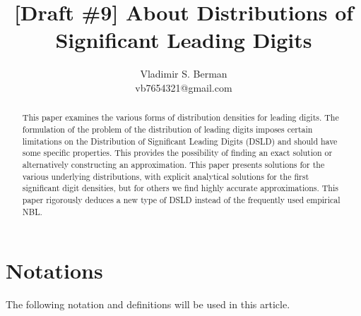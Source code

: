 \documentclass[titlepage,fleqn]{article}%
\begin{document}
\title{[Draft \#9] About Distributions of Significant Leading Digits}
\author{Vladimir S. Berman\\vb7654321@gmail.com}
\maketitle

\begin{abstract}
This paper examines the various forms of distribution densities for leading
digits. The formulation of the problem of the distribution of leading digits
imposes certain limitations on the Distribution of Significant Leading Digits
(DSLD) and should have some specific properties. This provides the possibility
of finding an exact solution or alternatively constructing an approximation.
This paper presents solutions for the various underlying distributions, with
explicit analytical solutions for the first significant digit densities, but
for others we find highly accurate approximations. This paper rigorously
deduces a new type of DSLD instead of the frequently used empirical NBL.

\end{abstract}
\tableofcontents
\listoffigures
\listoftables

\section{Notations }

The following notation and definitions will be used in this article.%
\end{document}
